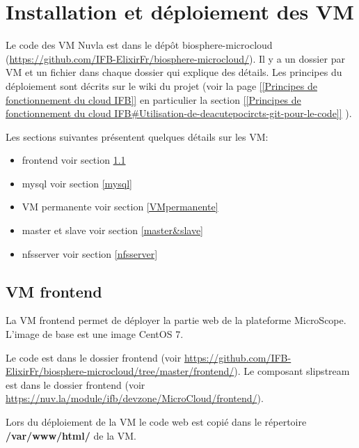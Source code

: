 \section {Installation et déploiement des VM}

Le code des VM Nuvla est dans le dépôt biosphere-microcloud (\url{https://github.com/IFB-ElixirFr/biosphere-microcloud/}).
Il y a un dossier par VM et un fichier  dans chaque dossier qui explique des détails.
Les principes du déploiement sont décrits sur le wiki du projet (voir la page
\href{https://intranet.genoscope.cns.fr/agc/redmine/projects/microcloud/wiki/Principes_de_fonctionnement_du_cloud_IFB}
{[[Principes de fonctionnement du cloud IFB]]}
en particulier la section
\href{https://intranet.genoscope.cns.fr/agc/redmine/projects/microcloud/wiki/Principes_de_fonctionnement_du_cloud_IFB#Utilisation-de-deacutepocircts-git-pour-le-code}
{[[Principes de fonctionnement du cloud IFB\#Utilisation-de-deacutepocircts-git-pour-le-code]]}
).

Les sections suivantes présentent quelques détails sur les VM:
\begin{itemize}
	\item frontend voir section \ref{frontend}
	\item mysql voir section \ref{mysql}
	\item VM permanente voir section \ref{VMpermanente}
	\item master et slave voir section \ref{master&slave}
	\item nfsserver voir section \ref{nfsserver}
\end{itemize}
\bigskip

\subsection {VM frontend}\label{frontend}


La VM frontend permet de déployer la partie web de la plateforme MicroScope.
L'image de base est une image CentOS 7.

Le code est dans le dossier frontend (voir \url{https://github.com/IFB-ElixirFr/biosphere-microcloud/tree/master/frontend/}).
Le composant slipstream est dans le dossier frontend (voir \url{https://nuv.la/module/ifb/devzone/MicroCloud/frontend/}).
\bigskip

Lors du déploiement de la VM le code web est copié dans le répertoire \textbf{/var/www/html/} de la VM.
\bigskip

